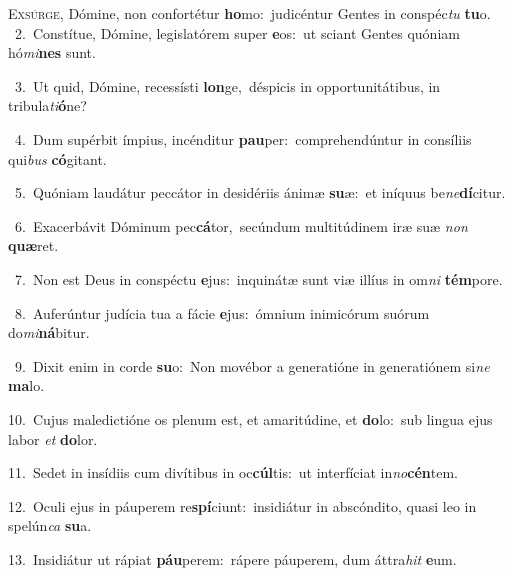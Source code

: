 \lettrine{\initial\textcolor{\initialcolor}{E}}{xsúrge,} Dómine, non confortétur \textbf{ho}\-mo:~\star judicéntur Gentes in conspéc\textit{tu} \textbf{tu}\-o.\\
{\numbfont\textcolor{\numbcolor}{~2.}}~Constítue, Dómine, legislatórem super \textbf{e}\-os:~\star ut sciant Gentes quóniam hó\-\textit{mi}\-\textbf{nes} sunt.\par
{\numbfont\textcolor{\numbcolor}{~3.}}~Ut quid, Dómine, recessísti \textbf{lon}\-ge,~\star déspicis in opportunitátibus, in tribula\-\textit{ti}\-\textbf{ó}ne?\par
{\numbfont\textcolor{\numbcolor}{~4.}}~Dum supérbit ímpius, incénditur \textbf{pau}\-per:~\star comprehendúntur in consíliis qui\textit{bus} \textbf{có}\-gitant.\par
{\numbfont\textcolor{\numbcolor}{~5.}}~Quóniam laudátur peccátor in desidériis ánimæ \textbf{su}\-æ:~\star et iníquus be\-\textit{ne}\-\textbf{dí}citur.\par
{\numbfont\textcolor{\numbcolor}{~6.}}~Exacerbávit Dóminum pec\-\textbf{cá}\-tor,~\star secúndum multitúdinem iræ suæ \textit{non} \textbf{quæ}\-ret.\par
{\numbfont\textcolor{\numbcolor}{~7.}}~Non est Deus in conspéctu \textbf{e}\-jus:~\star inquinátæ sunt viæ illíus in om\textit{ni} \textbf{tém}\-pore.\par
{\numbfont\textcolor{\numbcolor}{~8.}}~Auferúntur judícia tua a fácie \textbf{e}\-jus:~\star ómnium inimicórum suórum do\-\textit{mi}\-\textbf{ná}bitur.\par
{\numbfont\textcolor{\numbcolor}{~9.}}~Dixit enim in corde \textbf{su}\-o:~\star Non movébor a generatióne in generatiónem si\textit{ne} \textbf{ma}\-lo.\par
{\numbfont\textcolor{\numbcolor}{10.}}~Cujus maledictióne os plenum est, et amaritúdine, et \textbf{do}\-lo:~\star sub lingua ejus labor \textit{et} \textbf{do}\-lor.\par
{\numbfont\textcolor{\numbcolor}{11.}}~Sedet in insídiis cum divítibus in oc\-\textbf{cúl}\-tis:~\star ut interfíciat in\-\textit{no}\-\textbf{cén}tem.\par
{\numbfont\textcolor{\numbcolor}{12.}}~Oculi ejus in páuperem re\-\textbf{spí}\-ciunt:~\star insidiátur in abscóndito, quasi leo in spelún\textit{ca} \textbf{su}\-a.\par
{\numbfont\textcolor{\numbcolor}{13.}}~Insidiátur ut rápiat \textbf{páu}\-perem:~\star rápere páuperem, dum áttra\textit{hit} \textbf{e}\-um.\par
